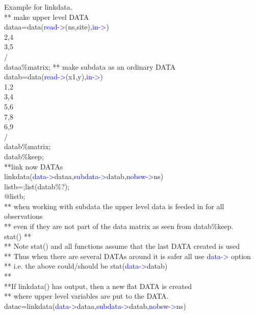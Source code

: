\begin{example}[linkdataex]Example for linkdata.\\
\label{linkdataex}
** make upper level DATA\\
dataa=\textcolor{VioletRed}{data}(\textcolor{blue}{read->}(ns,site),\textcolor{blue}{in->})\\
2,4\\
3,5\\
/\\
dataa\%matrix;
** make subdata as an ordinary DATA\\
datab=\textcolor{VioletRed}{data}(\textcolor{blue}{read->}(x1,y),\textcolor{blue}{in->})\\
1,2\\
3,4\\
5,6\\
7,8\\
6,9\\
/\\
datab\%matrix;\\
datab\%keep;\\
**link now DATAs\\
\textcolor{VioletRed}{linkdata}(\textcolor{blue}{data->}dataa,\textcolor{blue}{subdata->}datab,\textcolor{blue}{nobsw->}ns)\\
listb=;list(datab\%?);\\
@listb;\\
** when working with subdata the upper level data is feeded in for all observations\\
**   even if they are not part of the data matrix as seen from datab\%keep.\\
\textcolor{VioletRed}{stat}()
**\\
** Note \textcolor{VioletRed}{stat}() and all functions assume that the last DATA created is used\\
** Thus when there are several DATAs around it is safer all use \textcolor{blue}{data->} option\\
** i.e. the above could/should be \textcolor{VioletRed}{stat}(\textcolor{blue}{data->}datab)\\
**\\
**If \textcolor{VioletRed}{linkdata}() has output, then a new flat DATA is created\\
** where upper level variables are put to the DATA.\\
datac=\textcolor{VioletRed}{linkdata}(\textcolor{blue}{data->}dataa,\textcolor{blue}{subdata->}datab,\textcolor{blue}{nobsw->}ns)\\

\end{example}
